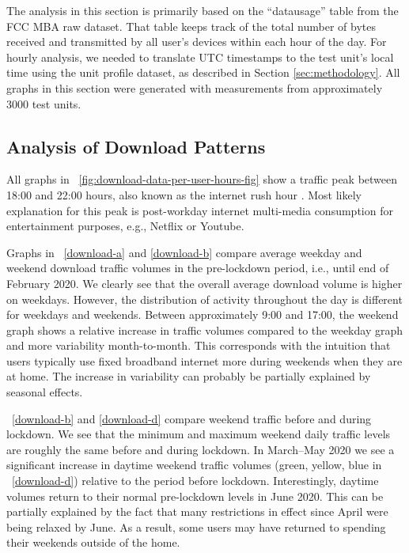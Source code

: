 The analysis in this section is primarily based on the ``datausage'' table from the FCC MBA raw dataset. That table keeps track of the total number of bytes received and transmitted by all user's devices within each hour of the day. For hourly analysis, we needed to translate UTC timestamps to the test unit's local time using the unit profile dataset, as described in Section \ref{sec:methodology}. All graphs in this section were generated with measurements from approximately 3000 test units.

\subsection{Analysis of Download Patterns}
\label{sec:analysis-of-download-patterns}

All graphs in \figurename~\ref{fig:download-data-per-user-hours-fig} show a traffic peak between 18:00 and 22:00 hours, also known as the internet rush hour \cite{internetrushhour}. Most likely explanation for this peak is post-workday internet multi-media consumption for entertainment purposes, e.g., Netflix or Youtube.

Graphs in \figurename~\ref{download-a} and \ref{download-b} compare average weekday and weekend download traffic volumes in the pre-lockdown period, i.e., until end of February 2020. We clearly see that the overall average download volume is higher on weekdays. However, the distribution of activity throughout the day is different for weekdays and weekends. Between approximately 9:00 and 17:00, the weekend graph shows a relative increase in traffic volumes compared to the weekday graph and more variability month-to-month. This corresponds with the intuition that users typically use fixed broadband internet more during weekends when they are at home. The increase in variability can probably be partially explained by seasonal effects.

\figurename~\ref{download-b} and \ref{download-d} compare weekend traffic before and during lockdown. We see that the minimum and maximum weekend daily traffic levels are roughly the same before and during lockdown. In March--May 2020 we see a significant increase in daytime weekend traffic volumes (green, yellow, blue in \figurename~\ref{download-d}) relative to the period before lockdown. Interestingly, daytime volumes return to their normal pre-lockdown levels in June 2020. This can be partially explained by the fact that many restrictions in effect since April were being relaxed by June. As a result, some users may have returned to spending their weekends outside of the home. %

